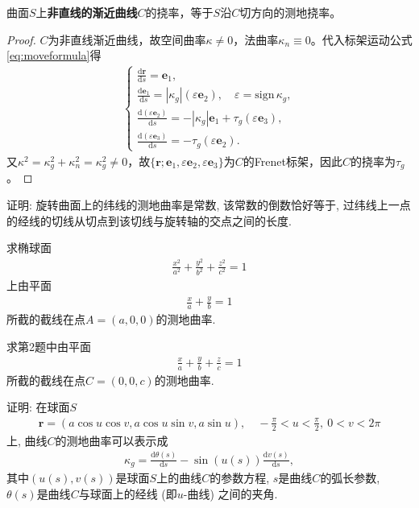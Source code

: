 \documentclass[../../main.tex]{subfiles}%
\begin{document}
\begin{theorem}
曲面$S$上\textbf{非直线的渐近曲线}$C$的挠率，等于$S$沿$C$切方向的测地挠率。
\end{theorem}
\begin{proof}
$C$为非直线渐近曲线，故空间曲率$\kappa\neq0$，法曲率$\kappa_n\equiv0$。代入标架运动公式\eqref{eq:moveformula}得
\begin{align*}
\begin{cases}
\displaystyle\frac{\mathrm{d}\boldsymbol{r}}{\mathrm{d}s}=\boldsymbol{e}_1,\\
\displaystyle\frac{\mathrm{d}\boldsymbol{e}_1}{\mathrm{d}s}=|\kappa_g|(\varepsilon\boldsymbol{e}_2),\quad \varepsilon=\mathrm{sign}\,\kappa_g,\\
\displaystyle\frac{\mathrm{d}(\varepsilon\boldsymbol{e}_2)}{\mathrm{d}s}=-|\kappa_g|\boldsymbol{e}_1+\tau_g(\varepsilon\boldsymbol{e}_3),\\
\displaystyle\frac{\mathrm{d}(\varepsilon\boldsymbol{e}_3)}{\mathrm{d}s}=-\tau_g(\varepsilon\boldsymbol{e}_2).
\end{cases}
\end{align*}
又$\kappa^2=\kappa_g^2+\kappa_n^2=\kappa_g^2\neq0$，故$\{\boldsymbol{r};\boldsymbol{e}_1,\varepsilon\boldsymbol{e}_2,\varepsilon\boldsymbol{e}_3\}$为$C$的Frenet标架，因此$C$的挠率为$\tau_g$。
\end{proof}

\begin{example}
证明: 旋转曲面上的纬线的测地曲率是常数, 该常数的倒数恰好等于, 过纬线上一点的经线的切线从切点到该切线与旋转轴的交点之间的长度.
\end{example}

\begin{example}
求椭球面
\begin{align*}
\frac{x^2}{a^2}+\frac{y^2}{b^2}+\frac{z^2}{c^2}=1
\end{align*}
上由平面
\begin{align*}
\frac{x}{a}+\frac{y}{b}=1
\end{align*}
所截的截线在点$A=(a,0,0)$的测地曲率.
\end{example}

\begin{example}
求第2题中由平面
\begin{align*}
\frac{x}{a}+\frac{y}{b}+\frac{z}{c}=1
\end{align*}
所截的截线在点$C=(0,0,c)$的测地曲率.
\end{example}

\begin{example}
证明: 在球面$S$
\begin{align*}
\bm{r}=(a\cos u\cos v,a\cos u\sin v,a\sin u),\quad -\frac{\pi}{2}<u<\frac{\pi}{2},\ 0<v<2\pi
\end{align*}
上, 曲线$C$的测地曲率可以表示成
\begin{align*}
\kappa_g=\frac{\mathrm{d}\theta(s)}{\mathrm{d}s}-\sin(u(s))\frac{\mathrm{d}v(s)}{\mathrm{d}s},
\end{align*}
其中$(u(s),v(s))$是球面$S$上的曲线$C$的参数方程, $s$是曲线$C$的弧长参数, $\theta(s)$是曲线$C$与球面上的经线 (即$u$-曲线) 之间的夹角.
\end{example}
\end{document}
